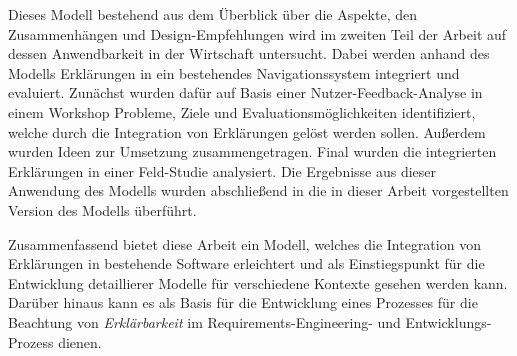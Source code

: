 Dieses Modell bestehend aus dem Überblick über die Aspekte, den Zusammenhängen und Design-Empfehlungen wird im zweiten Teil der Arbeit auf dessen Anwendbarkeit in der Wirtschaft untersucht. Dabei werden anhand des Modells Erklärungen in ein bestehendes Navigationssystem integriert und evaluiert. Zunächst wurden dafür auf Basis einer Nutzer-Feedback-Analyse in einem Workshop Probleme, Ziele und Evaluationsmöglichkeiten identifiziert, welche durch die Integration von Erklärungen gelöst werden sollen. Außerdem wurden Ideen zur Umsetzung zusammengetragen. Final wurden die integrierten Erklärungen in einer Feld-Studie analysiert. Die Ergebnisse aus dieser Anwendung des Modells wurden abschließend in die in dieser Arbeit vorgestellten Version des Modells überführt.

Zusammenfassend bietet diese Arbeit ein Modell, welches die Integration von Erklärungen in bestehende Software erleichtert und als Einstiegspunkt für die Entwicklung detaillierer Modelle für verschiedene Kontexte gesehen werden kann. Darüber hinaus kann es als Basis für die Entwicklung eines Prozesses für die Beachtung von \textit{Erklärbarkeit} im Requirements-Engineering- und Entwicklungs-Prozess dienen.